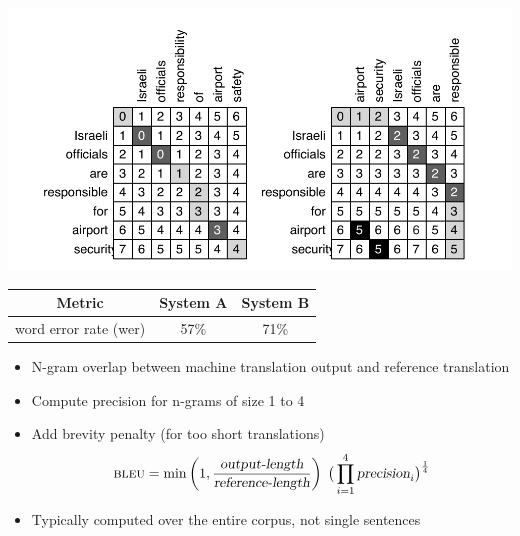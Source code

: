 \documentclass[landscape]{slides}
\newcommand{\maths}[1]{\textcolor{purple}{#1}}
\begin{document}
\vspace{-5mm}
\begin{center}
\includegraphics[scale=1.23]{levenshtein.pdf}

\vspace{5mm}
\begin{tabular}{c|c|c}
\bf Metric & \bf System A & \bf System B \\ \hline
word error rate ({\sc wer}) & 57\% & 71\% \\ \hline
\end{tabular}
\end{center}


\vspace{10mm}
\begin{itemize}
\item N-gram overlap between machine translation output and reference translation
\item Compute precision for n-grams of size 1 to 4
\item Add brevity penalty (for too short translations)
\maths{\begin{equation*}
\text{\sc bleu} = \min \left( 1,\frac{\text{\em output-length}}{\text{\em reference-length}} \right) \; \big( \prod_{i=1}^4 \text{\em precision}_i \big)^\frac{1}{4}
\end{equation*}}
\item Typically computed over the entire corpus, not single sentences
\end{itemize}

\end{document}
